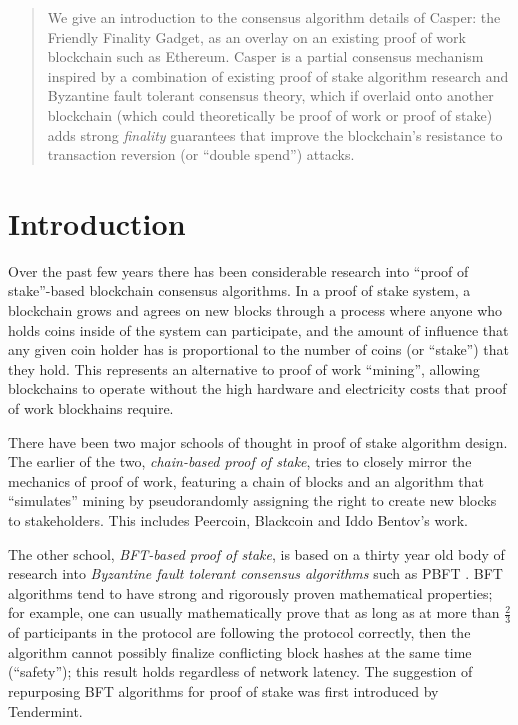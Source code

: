 \documentclass[12pt, final]{article}
\begin{document}
\maketitle

\begin{abstract}
We give an introduction to the consensus algorithm details of Casper: the Friendly Finality Gadget, as an overlay on an existing proof of work blockchain such as Ethereum. Casper is a partial consensus mechanism inspired by a combination of existing proof of stake algorithm research and Byzantine fault tolerant consensus theory, which if overlaid onto another blockchain (which could theoretically be proof of work or proof of stake) adds strong \textit{finality} guarantees that improve the blockchain's resistance to transaction reversion (or ``double spend'') attacks.
\end{abstract}

\section{Introduction}
\label{sect:intro}

Over the past few years there has been considerable research into ``proof of stake''-based blockchain consensus algorithms. In a proof of stake system, a blockchain grows and agrees on new blocks through a process where anyone who holds coins inside of the system can participate, and the amount of influence that any given coin holder has is proportional to the number of coins (or ``stake'') that they hold. This represents an alternative to proof of work ``mining'', allowing blockchains to operate without the high hardware and electricity costs that proof of work blockhains require.

There have been two major schools of thought in proof of stake algorithm design. The earlier of the two, \textit{chain-based proof of stake}, tries to closely mirror the mechanics of proof of work, featuring a chain of blocks and an algorithm that ``simulates'' mining by pseudorandomly assigning the right to create new blocks to stakeholders. This includes Peercoin\cite{king2012ppcoin}, Blackcoin\cite{vasin2014blackcoin} and Iddo Bentov's work\cite{bentov2016pos}.

The other school, \textit{BFT-based proof of stake}, is based on a thirty year old body of research into \textit{Byzantine fault tolerant consensus algorithms} such as PBFT \cite{castro1999practical}. BFT algorithms tend to have strong and rigorously proven mathematical properties; for example, one can usually mathematically prove that as long as at more than $\frac{2}{3}$ of participants in the protocol are following the protocol correctly, then the algorithm cannot possibly finalize conflicting block hashes at the same time (``safety''); this result holds regardless of network latency. The suggestion of repurposing BFT algorithms for proof of stake was first introduced by Tendermint\cite{kwon2014tendermint}.
\end{document}
